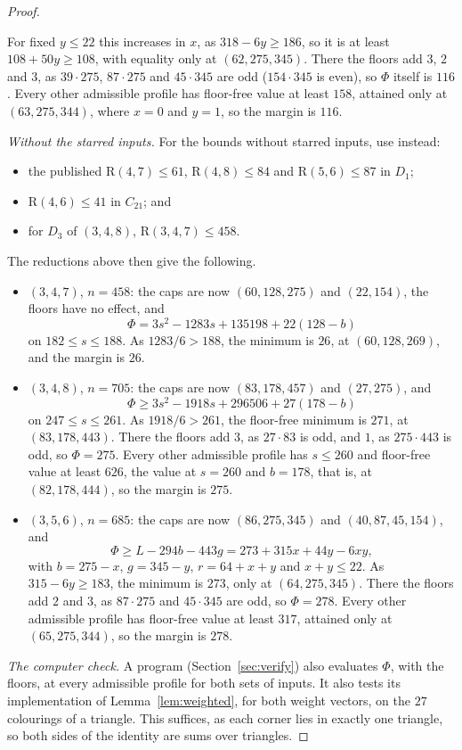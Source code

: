 \documentclass[11pt]{article}
\theoremstyle{spacedplain}
\theoremstyle{spaceddef}
\theoremstyle{spacedremark}
\newcommand{\R}{\mathrm{R}}
\begin{document}
\begin{proof}
\begin{itemize}[leftmargin=1.2em]
For fixed $y\le 22$ this increases in $x$, as $318-6y\ge 186$, so it is at least $108+50y\ge 108$, with equality only at $(62,275,345)$.
There the floors add $3$, $2$ and $3$, as $39\cdot 275$, $87\cdot 275$ and $45\cdot 345$ are odd ($154\cdot 345$ is even), so $\Phi$ itself is $116$.
Every other admissible profile has floor-free value at least $158$, attained only at $(63,275,344)$, where $x=0$ and $y=1$, so the margin is $116$.
\end{itemize}

\emph{Without the starred inputs.}
For the bounds without starred inputs, use instead:
\begin{itemize}
\item the published $\R(4,7)\le 61$, $\R(4,8)\le 84$ and $\R(5,6)\le 87$ in $D_1$;
\item $\R(4,6)\le 41$ in $C_{21}$; and
\item for $D_3$ of $(3,4,8)$, $\R(3,4,7)\le 458$.
\end{itemize}

The reductions above then give the following.
\begin{itemize}[leftmargin=1.2em]
\item $(3,4,7)$, $n=458$: the caps are now $(60,128,275)$ and $(22,154)$, the floors have no effect, and
\[
\Phi=3s^2-1283s+135198+22(128-b)
\]
on $182\le s\le 188$.
As $1283/6>188$, the minimum is $26$, at $(60,128,269)$, and the margin is $26$.

\item $(3,4,8)$, $n=705$: the caps are now $(83,178,457)$ and $(27,275)$, and
\[
\Phi\ge 3s^2-1918s+296506+27(178-b)
\]
on $247\le s\le 261$.
As $1918/6>261$, the floor-free minimum is $271$, at $(83,178,443)$.
There the floors add $3$, as $27\cdot 83$ is odd, and $1$, as $275\cdot 443$ is odd, so $\Phi=275$.
Every other admissible profile has $s\le 260$ and floor-free value at least $626$, the value at $s=260$ and $b=178$, that is, at $(82,178,444)$, so the margin is $275$.

\item $(3,5,6)$, $n=685$: the caps are now $(86,275,345)$ and $(40,87,45,154)$, and
\[
\Phi\ge L-294b-443g=273+315x+44y-6xy,
\]
with $b=275-x$, $g=345-y$, $r=64+x+y$ and $x+y\le 22$.
As $315-6y\ge 183$, the minimum is $273$, only at $(64,275,345)$.
There the floors add $2$ and $3$, as $87\cdot 275$ and $45\cdot 345$ are odd, so $\Phi=278$.
Every other admissible profile has floor-free value at least $317$, attained only at $(65,275,344)$, so the margin is $278$.
\end{itemize}

\emph{The computer check.}
A program (Section~\ref{sec:verify}) also evaluates $\Phi$, with the floors, at every admissible profile for both sets of inputs.
It also tests its implementation of Lemma~\ref{lem:weighted}, for both weight vectors, on the $27$ colourings of a triangle.
This suffices, as each corner lies in exactly one triangle, so both sides of the identity are sums over triangles.
\end{proof}
\end{document}

